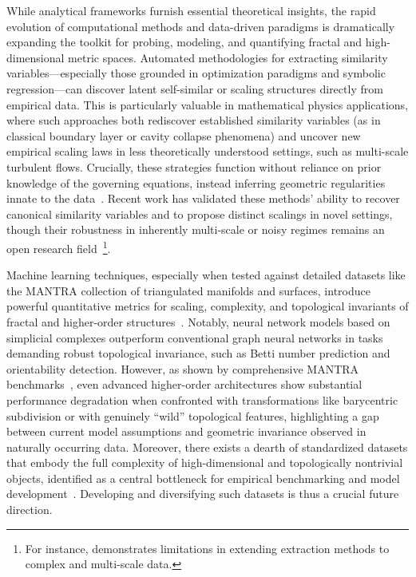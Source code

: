 \documentclass[sigconf]{acmart}
\begin{document}
While analytical frameworks furnish essential theoretical insights, the rapid evolution of computational methods and data-driven paradigms is dramatically expanding the toolkit for probing, modeling, and quantifying fractal and high-dimensional metric spaces. Automated methodologies for extracting similarity variables—especially those grounded in optimization paradigms and symbolic regression—can discover latent self-similar or scaling structures directly from empirical data. This is particularly valuable in mathematical physics applications, where such approaches both rediscover established similarity variables (as in classical boundary layer or cavity collapse phenomena) and uncover new empirical scaling laws in less theoretically understood settings, such as multi-scale turbulent flows. Crucially, these strategies function without reliance on prior knowledge of the governing equations, instead inferring geometric regularities innate to the data~\cite{ref65}. Recent work has validated these methods' ability to recover canonical similarity variables and to propose distinct scalings in novel settings, though their robustness in inherently multi-scale or noisy regimes remains an open research field~\footnote{For instance, \cite{ref65} demonstrates limitations in extending extraction methods to complex and multi-scale data.}.

Machine learning techniques, especially when tested against detailed datasets like the MANTRA collection of triangulated manifolds and surfaces, introduce powerful quantitative metrics for scaling, complexity, and topological invariants of fractal and higher-order structures~\cite{ref26,ref39}. Notably, neural network models based on simplicial complexes outperform conventional graph neural networks in tasks demanding robust topological invariance, such as Betti number prediction and orientability detection. However, as shown by comprehensive MANTRA benchmarks~\cite{ref26}, even advanced higher-order architectures show substantial performance degradation when confronted with transformations like barycentric subdivision or with genuinely ``wild'' topological features, highlighting a gap between current model assumptions and geometric invariance observed in naturally occurring data. Moreover, there exists a dearth of standardized datasets that embody the full complexity of high-dimensional and topologically nontrivial objects, identified as a central bottleneck for empirical benchmarking and model development~\cite{ref26,ref39}. Developing and diversifying such datasets is thus a crucial future direction.
\end{document}

